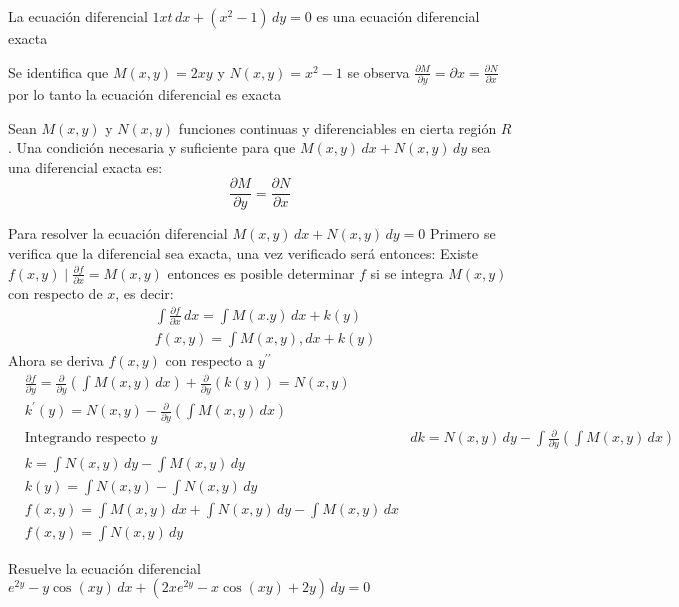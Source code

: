 \begin{example}
    La ecuación diferencial $1xt\, dx+\left(x^2-1\right)\,dy=0$ es una ecuación diferencial exacta
\end{example}

Se identifica que $M(x,y)=2xy$ y $N(x,y)=x^2-1$ se observa $\frac{\partial M}{\partial y}=\partial x=\frac{\partial N}{\partial x}$ 
por lo tanto la ecuación diferencial es exacta
\newpage
\begin{theorem}
    Sean $M(x,y)$ y $N(x,y)$ funciones continuas y diferenciables en cierta región $R$. Una condición necesaria y suficiente
    para que $M(x,y)\, dx+N(x,y)\,dy$ sea una diferencial exacta es:   
    \begin{equation}
        \frac{\partial M}{\partial y}=\frac{\partial N}{\partial x}
    \end{equation}
\end{theorem}

Para resolver la ecuación diferencial $M(x,y)\, dx+N(x,y)\, dy=0$
Primero se verifica que la diferencial sea exacta, una vez verificado será entonces: Existe $f(x,y)\mid \frac{\partial f}{\partial x}=M(x,y)$
entonces es posible determinar $f$ si se integra $M(x,y)$ con respecto de $x$, es decir: 
\begin{align*}
    &\int \frac{\partial f}{\partial x}\, dx=\int M(x.y)\, dx+k(y)\\
    &f(x,y)=\int M(x,y), dx+k(y)
\end{align*}
Ahora se deriva $f(x,y)$ con respecto a $y^{\prime \prime}$
\begin{align*}
    &\frac{\partial f}{\partial y}=\frac{\partial}{\partial y}\left(\int M(x,y)\, dx\right)+\frac{\partial}{\partial y}\left(k(y)\right)=N(x,y)\\
    &k^{\prime}(y)=N(x,y)-\frac{\partial }{\partial y}\left(\int M(x,y)\, dx\right)\\
    &\text{Integrando respecto }y
    &dk=N(x,y)\, dy-\int \frac{\partial}{\partial y}\left(\int M(x,y)\, dx\right)\\
    &k=\int N(x,y)\, dy-\int M(x,y)\, dy\\
    &k(y)=\int N(x,y)-\int N(x,y)\, dy\\
    &f(x,y)=\int M(x,y)\, dx+\int N(x,y)\, dy-\int M(x,y)\, dx\\
    &f(x,y)=\int N(x,y)\, dy
\end{align*}


\begin{example}
    Resuelve la ecuación diferencial $e^{2y}-y\cos{(xy)}\,dx+\left(2xe^{2y}-x\cos{(xy)}+2y\right)\, dy=0$
\end{example}

